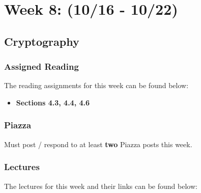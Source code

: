 \clearpage
\chapter{Week 8: (10/16 - 10/22)}

\section{Cryptography}

\subsection{Assigned Reading}

The reading assignments for this week can be found below:

\begin{itemize}
    \item \textbf{Sections 4.3, 4.4, 4.6}
\end{itemize}

\subsection{Piazza}

Must post / respond to at least \textbf{two} Piazza posts this week.  

\subsection{Lectures}

The lectures for this week and their links can be found below:

